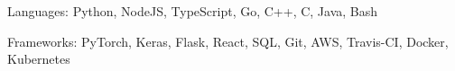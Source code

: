 


\begin{cvskills}


\cvskill
{Languages:} %
{Python, NodeJS, TypeScript, Go, C++, C, Java, Bash} %


\cvskill
{Frameworks:} %
{PyTorch, Keras, Flask, React, SQL, Git, AWS, Travis-CI, Docker, Kubernetes}


\end{cvskills}